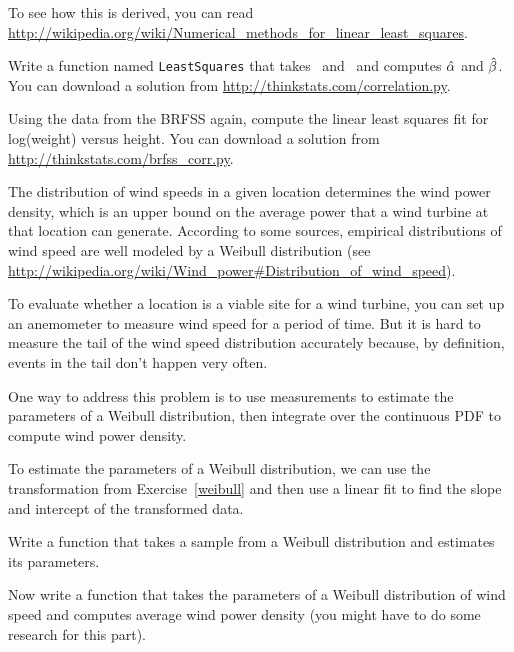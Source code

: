 \documentclass[12pt]{book}
\begin{document}
To see how this is derived, you can read
\url{http://wikipedia.org/wiki/Numerical_methods_for_linear_least_squares}.


\begin{exercise}
Write a function named {\tt LeastSquares} that takes \X~and \Y~and
computes $\hat{\alpha}$ and $\hat{\beta}$.  You can download a
solution from \url{http://thinkstats.com/correlation.py}.  

\end{exercise}

\begin{exercise}
Using the data from the BRFSS again, compute the linear least squares
fit for log(weight) versus height.  You can download a
solution from \url{http://thinkstats.com/brfss_corr.py}.

\end{exercise}


\begin{exercise}
The distribution of wind speeds in a given location determines the
wind power density, which is an upper bound on the average power that
a wind turbine at that location can generate.  According to some
sources, empirical distributions of wind speed are well modeled by a
Weibull distribution (see
\url{http://wikipedia.org/wiki/Wind_power#Distribution_of_wind_speed}).

To evaluate whether a location is a viable site for a wind turbine,
you can set up an anemometer to measure wind speed for a period of
time.  But it is hard to measure the tail of the wind speed distribution
accurately because, by definition, events in the tail don't happen
very often.

One way to address this problem is to use measurements to estimate the
parameters of a Weibull distribution, then integrate over the
continuous PDF to compute wind power density.

To estimate the parameters of a Weibull distribution, we can use the
transformation from Exercise~\ref{weibull} and then use a linear fit
to find the slope and intercept of the transformed data.

Write a function that takes a sample from a Weibull distribution and
estimates its parameters.

Now write a function that takes the parameters of a Weibull distribution
of wind speed and computes average wind power density (you might have
to do some research for this part).

\end{exercise}
\end{document}
